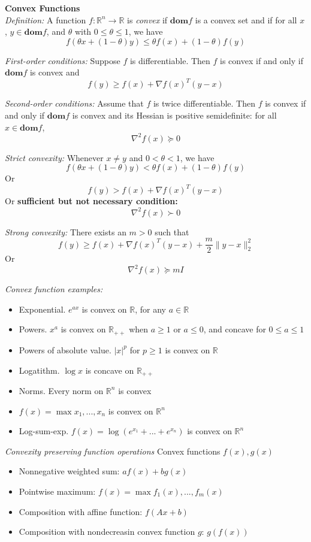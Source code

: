 \documentclass[10pt,landscape]{article}
\begin{document}
\begin{multicols}{3}
\textbf{Convex Functions} \\
\emph{Definition:} A function $f: \mathbb{R}^n \to \mathbb{R}$ is \emph{convex} if $\mathbf{dom} f$ is a convex set and if for all $x$, $y \in \mathbf{dom} f$, and $\theta$ with $0 \leq \theta \leq 1$, we have \\
$$ f(\theta x + (1 - \theta) y) \leq \theta f(x) + (1 - \theta) f(y) $$

\emph{First-order conditions:} Suppose $f$ is differentiable. Then $f$ is convex if and only if $\mathbf{dom} f$ is convex and
$$ f(y) \geq f(x) + \nabla f(x)^T (y-x) $$

\emph{Second-order conditions:} Assume that $f$ is twice differentiable. Then $f$ is convex if and only if $\mathbf{dom} f$ is convex and its Hessian is positive semidefinite: for all $x \in \mathbf{dom} f$,
$$ {\nabla}^2 f(x) \succeq 0 $$

\emph{Strict convexity:} Whenever $x \neq y$ and $0 < \theta < 1$, we have
$$ f(\theta x + (1 - \theta) y) < \theta f(x) + (1 - \theta) f(y) $$
Or
$$ f(y) > f(x) + \nabla f(x)^T (y-x) $$
Or \textbf{sufficient but not necessary condition:}
$$ {\nabla}^2 f(x) \succ 0 $$

\emph{Strong convexity:} There exists an $m > 0$ such that
$$ f(y) \geq f(x) + \nabla f(x)^T (y-x) + \frac{m}{2} \| y-x \|_2^2 $$
Or
$$ \nabla^2 f(x) \succeq mI $$

\emph{Convex function examples:}
\begin{itemize}
	\item Exponential. $e^{ax}$ is convex on $\mathbb{R}$, for any $a \in \mathbb{R}$
	\item Powers. $x^a$ is convex on $\mathbb{R}_{++}$ when $a \geq 1$ or $a \leq 0$, and concave for $0 \leq a \leq 1$
	\item Powers of absolute value. $|x|^p$ for $p \geq 1$ is convex on $\mathbb{R}$
	\item Logatithm. $\log x$ is concave on $\mathbb{R}_{++}$
	\item Norms. Every norm on $\mathbb{R}^n$ is convex
	\item $f(x) = \max{x_1, ... , x_n}$ is convex on $\mathbb{R}^n$
	\item Log-sum-exp. $f(x) = \log(e^{x_1} + ... + e^{x_n})$ is convex on $\mathbb{R}^n$
\end{itemize}

\emph{Convexity preserving function operations}
Convex functions $f(x), g(x)$
\begin{itemize}
	\item Nonnegative weighted sum: $a f(x) + b g(x)$
	\item Pointwise maximum: $f(x) = \max{f_1(x), ... , f_m(x)}$
	\item Composition with affine function: $f(Ax+b)$
	\item Composition with nondecreasin convex function $g$: $g(f(x))$
\end{itemize}


\end{multicols}
\end{document}
